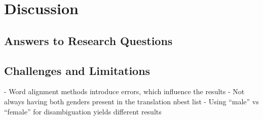 \chapter{Discussion}
\label{ch:Discussion}


\section{Answers to Research Questions}
\label{sec:Discussion:Answers}

\section{Challenges and Limitations}
\label{sec:Discussion:Challenges}

- Word alignment methods introduce errors, which influence the results
- Not always having both genders present  in the translation nbest list
- Using “male” vs “female” for disambiguation yields different results
